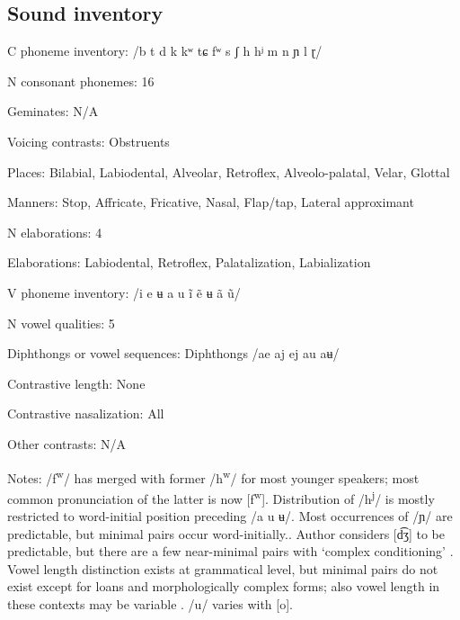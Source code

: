 {\subsection*{Sound inventory}
\begin{appendixdesc}

\item[C phoneme inventory:] /b t d k kʷ tɕ fʷ s ʃ h hʲ m n ɲ l ɽ/

\item[N consonant phonemes:] 16

\item[Geminates:] N/A

\item[Voicing contrasts:] Obstruents

\item[Places:] Bilabial, Labiodental, Alveolar, Retroflex, Alveolo-palatal, Velar, Glottal

\item[Manners:] Stop, Affricate, Fricative, Nasal, Flap/tap, Lateral approximant

\item[N elaborations:] 4

\item[Elaborations:] Labiodental, Retroflex, Palatalization, Labialization

\item[V phoneme inventory:] /i e ʉ a u ĩ ẽ ʉ ã ũ/

\item[N vowel qualities:] 5

\item[Diphthongs or vowel sequences:] Diphthongs /ae aj ej au aʉ/

\item[Contrastive length:] None

\item[Contrastive nasalization:] All

\item[Other contrasts:] N/A

\item[Notes:] /f\textsuperscript{w}/ has merged with former /h\textsuperscript{w}/ for most younger speakers; most common pronunciation of the latter is now [f\textsuperscript{w}]. Distribution of /h\textsuperscript{j}/ is mostly restricted to word-initial position preceding /a u ʉ/. Most occurrences of /ɲ/ are predictable, but minimal pairs occur word-initially.. Author considers [d͡ʒ] to be predictable, but there are a few near-minimal pairs with ‘complex conditioning’ \citep[30--49]{Olawsky2006}. Vowel length distinction exists at grammatical level, but minimal pairs do not exist except for loans and morphologically complex forms; also vowel length in these contexts may be variable \citep[56--57]{Olawsky2006}. /u/ varies with [o].
\end{appendixdesc}
}
